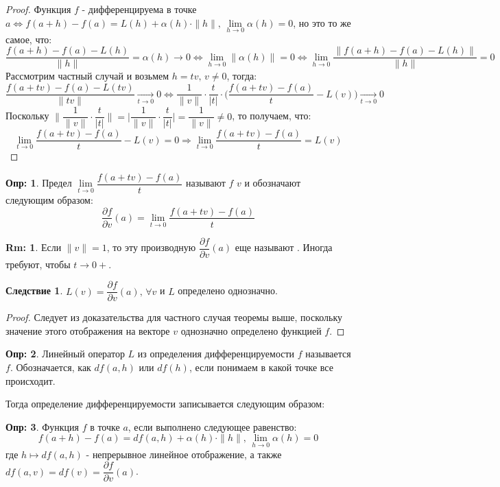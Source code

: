 \documentclass[12pt]{article}
\theoremstyle{definition}
\newtheorem{defn}{Опр:}
\newtheorem{rem}{Rm:}
\newtheorem{corollary}{Следствие}
\begin{document}
\begin{proof}
	Функция $f$ - дифференцируема в точке $a \Leftrightarrow f(a+h) - f(a) = L(h) + \alpha(h){\cdot}\|h\|, \, \lim\limits_{h \to 0}{\alpha(h)} = 0$, но это то же самое, что:
	$$
		\dfrac{f(a+h) - f(a) - L(h)}{\|h\|} = \alpha(h) \to 0 \Leftrightarrow \lim\limits_{h \to 0} \|\alpha(h) \| = 0 \Leftrightarrow \lim\limits_{h \to 0} \dfrac{\|f(a+h) - f(a) - L(h)\|}{\|h\|} = 0
	$$
	Рассмотрим частный случай и возьмем $h = tv, \, v \neq 0$, тогда:
	$$
		\dfrac{f(a + tv) - f(a) - L(tv)}{\|tv\|} \xrightarrow[t \to 0]{} 0 \Leftrightarrow \dfrac{1}{\|v\|}{\cdot}\dfrac{t}{|t|}{\cdot}\bigg(\dfrac{f(a + tv) - f(a)}{t} - L(v)\bigg) \xrightarrow[t \to 0]{} 0
	$$
	Поскольку $\bigg\|\dfrac{1}{\|v\|}{\cdot}\dfrac{t}{|t|}\bigg\| = \bigg|\dfrac{1}{\|v\|}{\cdot}\dfrac{t}{|t|}\bigg| = \dfrac{1}{\|v\|} \neq 0$, то получаем, что: 
	$$
		\lim\limits_{t \to 0} \dfrac{f(a + tv) - f(a)}{t} - L(v) = 0 \Rightarrow 
		 \lim\limits_{t \to 0} \dfrac{f(a + tv) - f(a)}{t} = L(v)
	$$
\end{proof}
\begin{defn}
	Предел $\lim\limits_{t \to 0} \dfrac{f(a + tv) - f(a)}{t}$ называют  $f$  $v$ и обозначают следующим образом: 
	$$
		\dfrac{\partial f}{\partial v}(a) = \lim\limits_{t \to 0} \dfrac{f(a + tv) - f(a)}{t}
	$$
\end{defn}
\begin{rem}
	Если $\|v\| = 1$, то эту производную $\dfrac{\partial f}{\partial v}(a)$ еще называют . Иногда требуют, чтобы $t \to 0+$.
\end{rem}
\begin{corollary}
	$L(v) = \dfrac{\partial f}{\partial v}(a), \, \forall v$ и $L$ определено однозначно.
\end{corollary}
\begin{proof}
	Следует из доказательства для частного случая теоремы выше, поскольку значение этого отображения на векторе $v$ однозначно определено функцией $f$.
\end{proof}

\begin{defn}
	Линейный оператор $L$ из определения дифференцируемости $f$ называется  $f$. Обозначается, как $df(a,h)$ или $df(h)$, если понимаем в какой точке все происходит.
\end{defn}

Тогда определение дифференцируемости записывается следующим образом:
\begin{defn}
	Функция $f$  в точке $a$, если выполнено следующее равенство:
	$$
		f(a + h) - f(a) = df(a,h) + \alpha(h){\cdot}\|h\|, \, \lim\limits_{h \to 0}{\alpha(h)} = 0
	$$
	где $h \mapsto df(a,h)$ - непрерывное линейное отображение, а также $df(a,v) = df(v) = \dfrac{\partial f}{\partial v}(a)$.
\end{defn}
\end{document}
